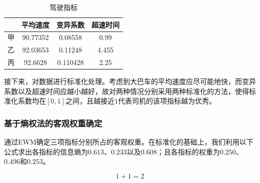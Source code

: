 \documentclass[bwprint]{cumcmthesis}
\begin{document}
        \begin{table}[htbp]
            \centering
            \caption{驾驶指标}
                \begin{tabular}{|c|c|c|c|}
                \hline
                & 平均速度 & 变异系数 & 超速时间 \\
                \hline
                甲     & 90.77352 & 0.08558 & 0.99 \\
                \hline
                乙     & 92.03653 & 0.11248 & 4.455 \\
                \hline
                丙     & 92.6628 & 0.110428 & 2.25 \\
                \hline
                \end{tabular}
            \label{tab:seven}
          \end{table}

        接下来，对数据进行标准化处理。考虑到大巴车的平均速度应尽可能地快，而变异系数以及超速时间应越小越好，故对两种情况分别采用两种标准化的方法，使得标准化系数均在$[0,1]$之间，且越接近$1$代表司机的该项指标越为优秀。

            \subsubsection{基于熵权法的客观权重确定}
            通过EWM确定三项指标分别所占的客观权重。在标准化的基础上，我们利用以下公式求出各指标的信息熵为$0.613$、$0.233$以及$0.608$；且各指标的权重为$0.250$、$0.496$和$0.253$。

            \begin{equation*}
                1+1=2
            \end{equation*}
\end{document}
